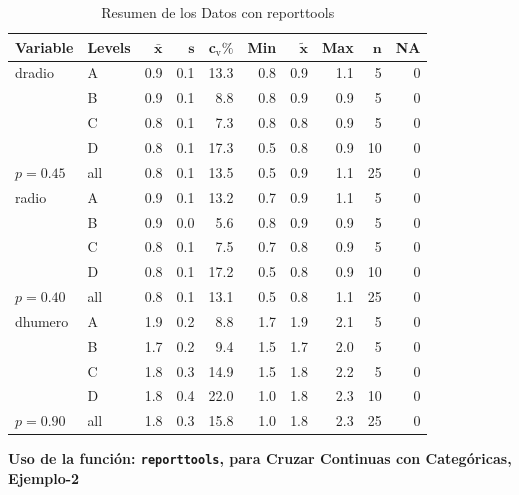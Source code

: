\documentclass[12pt,a4paper,]{book}
\numberwithin{dummy}{section}
\theoremstyle{ocrenumbox}
\theoremstyle{ocrenumbox}
\theoremstyle{ocrenumbox}
\theoremstyle{ocrenumbox}
\theoremstyle{ocrenum}
\begin{document}
\begin{table}[ht]
\centering
\begingroup\footnotesize
\begin{tabular}{llrrrrrrrr}
\textbf{Variable} & \textbf{Levels} & $\mathbf{\bar{x}}$ & $\mathbf{s}$ & c$_{\mathrm{v}}\%$ & \textbf{Min} & $\mathbf{\widetilde{x}}$ & \textbf{Max} & $\mathbf{n}$ & \textbf{NA} \\
\hline
dradio & A & 0.9 & 0.1 & 13.3 & 0.8 & 0.9 & 1.1 & 5 & 0 \\
& B & 0.9 & 0.1 & 8.8 & 0.8 & 0.9 & 0.9 & 5 & 0 \\
& C & 0.8 & 0.1 & 7.3 & 0.8 & 0.8 & 0.9 & 5 & 0 \\
& D & 0.8 & 0.1 & 17.3 & 0.5 & 0.8 & 0.9 & 10 & 0 \\
\hline
$p= 0.45$ & all & 0.8 & 0.1 & 13.5 & 0.5 & 0.9 & 1.1 & 25 & 0 \\
\hline
radio & A & 0.9 & 0.1 & 13.2 & 0.7 & 0.9 & 1.1 & 5 & 0 \\
& B & 0.9 & 0.0 & 5.6 & 0.8 & 0.9 & 0.9 & 5 & 0 \\
& C & 0.8 & 0.1 & 7.5 & 0.7 & 0.8 & 0.9 & 5 & 0 \\
& D & 0.8 & 0.1 & 17.2 & 0.5 & 0.8 & 0.9 & 10 & 0 \\
\hline
$p= 0.40$ & all & 0.8 & 0.1 & 13.1 & 0.5 & 0.8 & 1.1 & 25 & 0 \\\hline
dhumero & A & 1.9 & 0.2 & 8.8 & 1.7 & 1.9 & 2.1 & 5 & 0 \\
& B & 1.7 & 0.2 & 9.4 & 1.5 & 1.7 & 2.0 & 5 & 0 \\
& C & 1.8 & 0.3 & 14.9 & 1.5 & 1.8 & 2.2 & 5 & 0 \\
& D & 1.8 & 0.4 & 22.0 & 1.0 & 1.8 & 2.3 & 10 & 0 \\
\hline
$p= 0.90$ & all & 1.8 & 0.3 & 15.8 & 1.0 & 1.8 & 2.3 & 25 & 0 \\
\hline
\end{tabular}
\endgroup
\caption{Resumen de los Datos con reporttools}
\label{tabla-2}
\end{table}

\textbf{Uso de la función: \texttt{reporttools}, para Cruzar Continuas
con Categóricas, Ejemplo-2}

\begingroup\fontsize{8}{10}\selectfont
\end{document}
